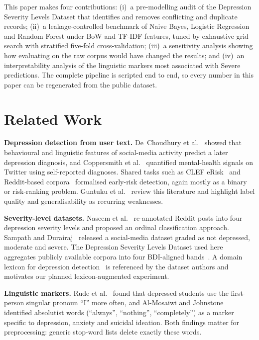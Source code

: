 \documentclass[conference]{IEEEtran}
\begin{document}
This paper makes four contributions: (i)~a pre-modelling audit of the Depression Severity Levels Dataset that identifies and removes conflicting and duplicate records; (ii)~a leakage-controlled benchmark of Naive Bayes, Logistic Regression and Random Forest under BoW and TF-IDF features, tuned by exhaustive grid search with stratified five-fold cross-validation; (iii)~a sensitivity analysis showing how evaluating on the raw corpus would have changed the results; and (iv)~an interpretability analysis of the linguistic markers most associated with Severe predictions. The complete pipeline is scripted end to end, so every number in this paper can be regenerated from the public dataset.

\section{Related Work}

\textbf{Depression detection from user text.} De~Choudhury et al.~\cite{dechoudhury2013predicting} showed that behavioural and linguistic features of social-media activity predict a later depression diagnosis, and Coppersmith et al.~\cite{coppersmith2014quantifying} quantified mental-health signals on Twitter using self-reported diagnoses. Shared tasks such as CLEF eRisk~\cite{losada2016test} and Reddit-based corpora~\cite{yates2017depression} formalised early-risk detection, again mostly as a binary or risk-ranking problem. Guntuku et al.~\cite{guntuku2017detecting} review this literature and highlight label quality and generalisability as recurring weaknesses.

\textbf{Severity-level datasets.} Naseem et al.~\cite{naseem2022early} re-annotated Reddit posts into four depression severity levels and proposed an ordinal classification approach. Sampath and Durairaj~\cite{sampath2022dataset} released a social-media dataset graded as not depressed, moderate and severe. The Depression Severity Levels Dataset used here aggregates publicly available corpora into four BDI-aligned bands~\cite{kuas2023dataset}. A domain lexicon for depression detection~\cite{cha2022lexicon} is referenced by the dataset authors and motivates our planned lexicon-augmented experiment.

\textbf{Linguistic markers.} Rude et al.~\cite{rude2004language} found that depressed students use the first-person singular pronoun ``I'' more often, and Al-Mosaiwi and Johnstone~\cite{almosaiwi2018absolute} identified absolutist words (``always'', ``nothing'', ``completely'') as a marker specific to depression, anxiety and suicidal ideation. Both findings matter for preprocessing: generic stop-word lists delete exactly these words.
\end{document}
